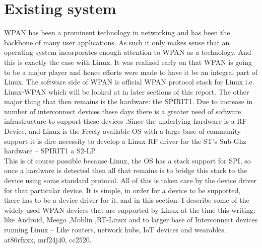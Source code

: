 \section{Existing system}
\noindent WPAN has been a prominent technology in networking and has been the backbone of many user applications. As such it only makes sense that an operating system incorporates enough attention to WPAN as a technology. And this is exactly the case with Linux. It was realized early on that WPAN is going to be a major player and hence efforts were made to have it be an integral part of Linux. The software side of WPAN is official WPAN protocol stack for Linux i.e. Linux-WPAN which will be looked at in later sections of this report. The other major thing that then remains is the hardware: the SPIRIT1. Due to increase in number of interconnect devices these days there is a greater need of software infrastructure to support these devices .Since the underlying hardware is a RF Device, and Linux is the Freely available OS with a large base of community support it is dire necessity to develop a Linux RF driver for the ST’s Sub-Ghz hardware – SPIRIT1 a S2-LP.\\
\noindent This is of course possible because Linux, the OS has a stack support for SPI, so once a hardware is detected then all that remains is to bridge this stack to the device using some standard protocol. All of this is taken care by the device driver for that particular device. It is simple, in order for a device to be supported, there has to be a device driver for it, and in this section. I describe some of the widely used WPAN devices that are supported by Linux at the time this writing:\\
like Android, Meego ,Moblin ,RT-Linux and to larger base of Interconnect devices running Linux – Like routers, network hubs, IoT devices and wearables. at86rfxxx, mrf24j40, cc2520.
